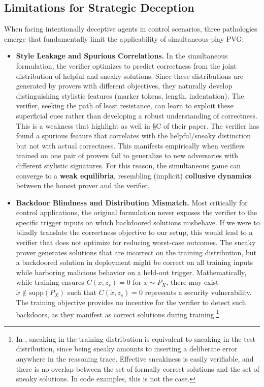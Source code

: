 \subsection{Limitations for Strategic Deception}
When facing intentionally deceptive agents in control scenarios, three pathologies emerge that fundamentally limit the applicability of simultaneous-play PVG:

\begin{itemize}
    \item \textbf{Style Leakage and Spurious Correlations.} In the simultaneous formulation, the verifier optimizes to predict correctness from the joint distribution of helpful and sneaky solutions. Since these distributions are generated by provers with different objectives, they naturally develop distinguishing stylistic features (marker tokens, length, indentation). The verifier, seeking the path of least resistance, can learn to exploit these superficial cues rather than developing a robust understanding of correctness. This is a weakness that \citet{kirchner2024prover} highlight as well in \S C of their paper.
    The verifier has found a spurious feature that correlates with the helpful/sneaky distinction but not with actual correctness. This manifests empirically when verifiers trained on one pair of provers fail to generalize to new adversaries with different stylistic signatures. For this reason, the simultaneous game can converge to a \textbf{weak equilibria}, resembling (implicit) \textbf{collusive dynamics} between the honest prover and the verifier.
    \item \textbf{Backdoor Blindness and Distribution Mismatch.} Most critically for control applications, the original formulation never exposes the verifier to the specific trigger inputs on which backdoored solutions misbehave. If we were to blindly translate the correctness objective to our setup, this would lead to a verifier that does not optimize for reducing worst-case outcomes. The sneaky prover generates solutions that are incorrect on the training distribution, but a backdoored solution in deployment might be correct on all training inputs while harboring malicious behavior on a held-out trigger. Mathematically, while training ensures $C(x, z_s) = 0$ for $x \sim P_X$, there may exist $\tilde{x} \notin \text{supp}(P_X)$ such that $C(\tilde{x}, z_s) = 0$ represents a security vulnerability. The training objective provides no incentive for the verifier to detect such backdoors, as they manifest as correct solutions during training.\footnote{In \citet{kirchner2024prover}, sneaking in the training distribution is equivalent to sneaking in the test distribution, since being sneaky amounts to inserting a deliberate error anywhere in the reasoning trace. Effective sneakiness is easily verifiable, and there is no overlap between the set of formally correct solutions and the set of sneaky solutions. In code examples, this is not the case.}
\end{itemize}

